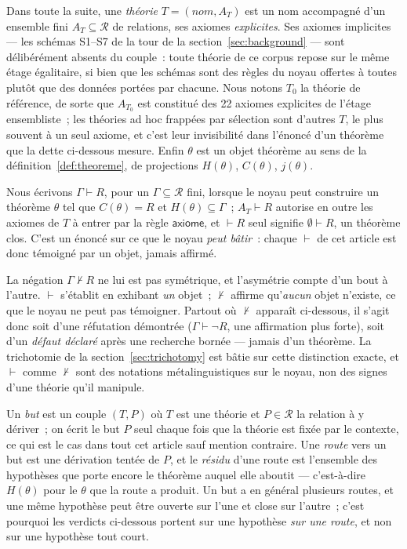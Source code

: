 \documentclass[11pt]{article}
\theoremstyle{remark}\newtheorem{example}{Exemple}
\begin{document}
Dans toute la suite, une \emph{théorie} $T = (\mathit{nom}, A_T)$ est un nom
accompagné d'un ensemble fini $A_T \subseteq \mathcal{R}$ de relations, ses axiomes
\emph{explicites}. Ses axiomes implicites --- les schémas S1--S7 de la tour de la
section~\ref{sec:background} --- sont délibérément absents du couple~: toute théorie de
ce corpus repose sur le même étage égalitaire, si bien que les schémas sont des règles
du noyau offertes à toutes plutôt que des données portées par chacune. Nous notons
$T_0$ la théorie de référence, de sorte que $A_{T_0}$ est constitué des 22 axiomes
explicites de l'étage ensembliste~; les théories ad hoc frappées par
sélection sont d'autres $T$, le plus souvent à un seul axiome, et c'est leur
invisibilité dans l'énoncé d'un théorème que la dette ci-dessous mesure. Enfin
$\theta$ est un objet théorème au sens de la définition~\ref{def:theoreme}, de
projections $H(\theta)$, $C(\theta)$, $j(\theta)$.

Nous écrivons $\Gamma \vdash R$, pour un $\Gamma \subseteq \mathcal{R}$ fini, lorsque
le noyau peut construire un théorème $\theta$ tel que $C(\theta) = R$ et
$H(\theta) \subseteq \Gamma$~; $A_T \vdash R$ autorise en outre les axiomes de $T$ à
entrer par la règle $\mathsf{axiome}$, et $\vdash R$ seul signifie
$\emptyset \vdash R$, un théorème clos. C'est un énoncé sur ce que le noyau
\emph{peut bâtir}~: chaque $\vdash$ de cet article est donc témoigné par un objet,
jamais affirmé.

La négation $\Gamma \nvdash R$ ne lui est pas symétrique, et l'asymétrie compte d'un bout
à l'autre. $\vdash$ s'établit en exhibant \emph{un} objet~; $\nvdash$ affirme
qu'\emph{aucun} objet n'existe, ce que le noyau ne peut pas témoigner. Partout où
$\nvdash$ apparaît ci-dessous, il s'agit donc soit d'une réfutation démontrée
($\Gamma \vdash \neg R$, une affirmation plus forte), soit d'un \emph{défaut déclaré}
après une recherche bornée --- jamais d'un théorème. La trichotomie de la
section~\ref{sec:trichotomy} est bâtie sur cette distinction exacte, et $\vdash$ comme
$\nvdash$ sont des notations métalinguistiques sur le noyau, non des signes d'une théorie
qu'il manipule.

Un \emph{but} est un couple $(T, P)$ où $T$ est une théorie et $P \in \mathcal{R}$ la
relation à y dériver~; on écrit le but $P$ seul chaque fois que la théorie est fixée par
le contexte, ce qui est le cas dans tout cet article sauf mention contraire. Une
\emph{route} vers un but est une dérivation tentée de $P$, et le \emph{résidu} d'une
route est l'ensemble des hypothèses que porte encore le théorème auquel elle aboutit ---
c'est-à-dire $H(\theta)$ pour le $\theta$ que la route a produit. Un but a
en général plusieurs routes, et une même hypothèse peut être ouverte sur l'une et
close sur l'autre~; c'est pourquoi les verdicts ci-dessous portent sur une hypothèse
\emph{sur une route}, et non sur une hypothèse tout court.
\end{document}
